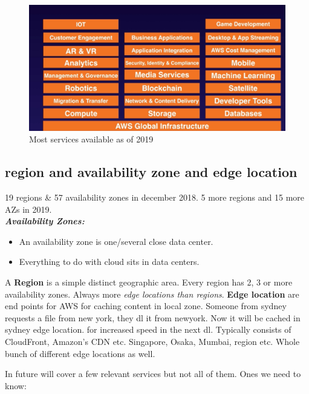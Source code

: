 \begin{figure}[htbp]
	\centering
	\includegraphics[width = 150mm]{./images/Most-services.png}
	\caption{Most services available as of 2019}
\end{figure}

\subsection{region and availability zone and edge location}
19 regions \& 57 availability zones in december 2018. 5 more regions and 15 more AZs in 2019. \\
\textbf{\textit{Availability Zones:}}
\begin{itemize}
	\item An availability zone is one/several close data center.
	\item Everything to do with cloud sits in data centers.
\end{itemize}

A \textbf{Region} is a simple distinct geographic area. Every region has 2, 3 or more availability zones. Always more \textit{edge locations than regions}. \textbf{Edge location} are end points for AWS for caching content in local zone. Someone from sydney requests a file from new york, they dl it from newyork. Now it will be cached in sydney edge location. for increased speed in the next dl. Typically consists of CloudFront, Amazon's CDN etc. Singapore, Osaka, Mumbai, region etc. Whole bunch of different edge locations as well.

In future will cover a few relevant services but not all of them. Ones we need to know:

